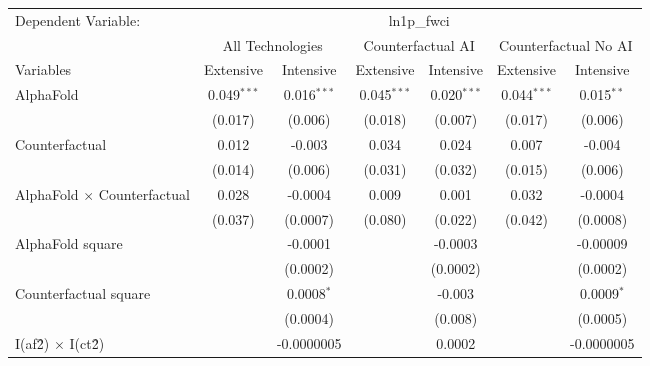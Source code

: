 \begingroup
\centering
\begin{tabular}{lcccccc}
   \tabularnewline \midrule \midrule
   Dependent Variable: & \multicolumn{6}{c}{ln1p\_fwci}\\
 & \multicolumn{2}{c}{All Technologies} & \multicolumn{2}{c}{Counterfactual AI} & \multicolumn{2}{c}{Counterfactual No AI} \\
\cmidrule(lr){1-1}\cmidrule(lr){2-3} \cmidrule(lr){4-5} \cmidrule(lr){6-7}
Variables & \multicolumn{1}{c}{Extensive} & \multicolumn{1}{c}{Intensive} & \multicolumn{1}{c}{Extensive} & \multicolumn{1}{c}{Intensive} & \multicolumn{1}{c}{Extensive} & \multicolumn{1}{c}{Intensive} \\
\cmidrule(lr){1-1}\cmidrule(lr){2-2} \cmidrule(lr){3-3} \cmidrule(lr){4-4} \cmidrule(lr){5-5} \cmidrule(lr){6-6} \cmidrule(lr){7-7}
   AlphaFold                          & 0.049$^{***}$ & 0.016$^{***}$ & 0.045$^{***}$ & 0.020$^{***}$ & 0.044$^{***}$ & 0.015$^{**}$\\   
                                      & (0.017)       & (0.006)       & (0.018)       & (0.007)       & (0.017)       & (0.006)\\   
   Counterfactual                     & 0.012         & -0.003        & 0.034         & 0.024         & 0.007         & -0.004\\   
                                      & (0.014)       & (0.006)       & (0.031)       & (0.032)       & (0.015)       & (0.006)\\   
   AlphaFold $\times$ Counterfactual  & 0.028         & -0.0004       & 0.009         & 0.001         & 0.032         & -0.0004\\   
                                      & (0.037)       & (0.0007)      & (0.080)       & (0.022)       & (0.042)       & (0.0008)\\   
   AlphaFold square                   &               & -0.0001       &               & -0.0003       &               & -0.00009\\   
                                      &               & (0.0002)      &               & (0.0002)      &               & (0.0002)\\   
   Counterfactual square              &               & 0.0008$^{*}$  &               & -0.003        &               & 0.0009$^{*}$\\   
                                      &               & (0.0004)      &               & (0.008)       &               & (0.0005)\\   
   I(af\^2) $\times$ I(ct\^2)         &               & -0.0000005    &               & 0.0002        &               & -0.0000005\\   

\end{tabular}
